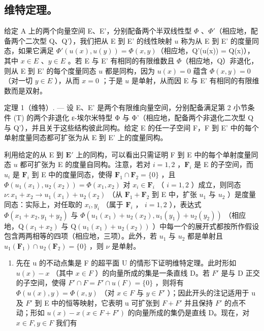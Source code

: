 \subsection{维特定理。}

给定 A 上的两个向量空间 E、E'，分别配备两个半双线性型 \(\Phi\) 、\(\Phi'\)（相应地，配备两个二次型 Q、Q'），我们把从 E 到 E' 的线性映射 \(u\) 称为从 E 到 E' 的度量同态，如果它满足 \(\Phi'(u(x), u(y)) = \Phi(x, y)\)（相应地，Q'(u(x)) = Q(x)），其中 \(x \in E\) 、\(y \in E\) 。若 E 与 E' 有相同的有限维数且 \(\Phi\)（相应地，Q）非退化，则从 E 到 E' 的每个度量同态 \(u\) 都是同构，因为 \(u(x) = 0\) 蕴含 \(\Phi(x, y) = 0\) （对一切 \(y \in E\) ），从而 \(x = 0\) ；于是 \(u\) 是单射，从而因 E 与 E' 有相同的有限维数而是双射。

定理 1（维特）. — 设 E、E' 是两个有限维向量空间，分别配备满足第 2 小节条件 (T) 的两个非退化 ε-埃尔米特型 Φ 与 Φ'（相应地，配备两个非退化二次型 Q 与 Q'），并且关于这些结构彼此同构。给定 E 的任一子空间 F，F 到 E' 中的每个单射度量同态都可扩张为从 E 到 E' 上的度量同构。

利用给定的从 E 到 \(\mathbf{E}'\) 上的同构，可以看出只需证明 F 到 E 中的每个单射度量同态 \(u\) 都可扩张为 E 的度量自同构。注意，若对 \(i = 1, 2\) ，\(\mathbf{F}_i\) 是 E 的子空间，而 \(u_i\) 是 \(\mathbf{F}_i\) 到 E 中的度量同态，使得 \(\mathbf{F}_1 \cap \mathbf{F}_2 = \{0\}\) ，且 \(\Phi(u_1(x_1), u_2(x_2)) = \Phi(x_1, x_2)\) 对 \(x_i \in \mathbf{F}_i\) （ \(i = 1, 2\) ）成立，则同态 \(\nu : x_1 + x_2 \to u_1(x_1) + u_2(x_2)\) （从 \(\mathbf{F}_1 + \mathbf{F}_2\) 到 E 中，扩张 \(u_1\) 与 \(u_2\) ）是度量同态：实际上，对任取的 \(x_i, y_i\) （属于 \(\mathbf{F}_i\) ， \(i = 1, 2\) ），表达式 \(\Phi(x_1 + x_2, y_1 + y_2)\) 与 \(\Phi(u_1(x_1) + u_2(x_2), u_1(y_1) + u_2(y_2))\) （相应地，\(\mathrm{Q}(x_1 + x_2)\) 与 \(\mathrm{Q}(u_1(x_1) + u_2(x_2))\) ）中每一个的展开式都按所作假设包含两两相等的四项（相应地，三项）。此外，若 \(u_1\) 与 \(u_2\) 都是单射且 \(u_1(\mathbf{F}_1) \cap u_2(\mathbf{F}_2) = \{0\}\) ，则 \(\nu\) 是单射。

\begin{enumerate}
\def\labelenumi{\arabic{enumi})}
\tightlist
\item
  先在 u 的不动点集是 F 的超平面 U 的情形下证明维特定理。此时形如 \(u(x) - x\) （其中 \(x \in F\) ）的向量所成的集是一条直线 D。若 \(F'\) 是与 D 正交的子空间，使得 \(F' \cap F = F' \cap u(F) = \{0\}\) ，则将有 \(\Phi(u(x), y) = \Phi(x, y)\) （对 \(x \in F\) 与 \(y \in F'\) ）；因此开头的注记适用于 u 及 \(F'\) 到 E 中的恒等映射，它表明 u 可扩张到 \(F + F'\) 并且保持 \(F'\) 的点不动；形如 \(u(x) - x (x \in F + F')\) 的向量所成的集仍是直线 D。现在，对 \(x \in F, y \in F\) 我们有
\end{enumerate}


